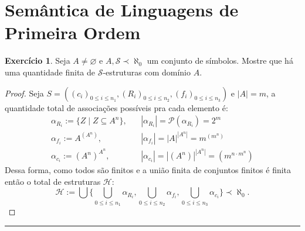 \documentclass[11pt]{article}
\theoremstyle{definition}
\newtheorem{exer}{Exercício}
\newcommand{\mc}[1]{\mathcal{#1}}
\begin{document}
\section{Semântica de Linguagens de Primeira Ordem}

\begin{exer}
Seja $A\ne\varnothing$ e $A,\mc{S}\prec\aleph_0$ um conjunto de símbolos. Mostre que há uma quantidade finita de $\mc{S}$-estruturas com domínio $A$.

\begin{proof}
Seja $S=((c_i)_{0\le i\le n_1},(R_i)_{0\le i\le n_2},(f_i)_{0\le i\le n_3})$ e $|A|=m$, a quantidade total de associações possíveis pra cada elemento é:
\begin{align*}
    \alpha_{R_i} :=\{Z\mid Z\subseteq A^n\}, & ~~~~|\alpha_{R_i}| =\mc{P}(\alpha_{R_i}) = 2^m\\
    \alpha_{f_i} :=A^{\left(A^n\right)}, & ~~~~|\alpha_{f_i}| = |A|^{|A^n|} = m^{\left(m^n\right)}\\
    \alpha_{c_i} :=\left(A^n\right)^{A^n}, & ~~~~|\alpha_{c_i}| = |\left(A^n\right)|^{|A^n|} = \left(m^{n\cdot m^n}\right)
\end{align*}
Dessa forma, como todos são finitos e a união finita de conjuntos finitos é finita então o total de estruturas $\mc{H}$:
\[
\mc{H}:=\bigcup\Biggl\{\bigcup_{0\le i\le n_1}\alpha_{R_i},\bigcup_{0\le i\le n_2}\alpha_{f_i},\bigcup_{0\le i\le n_3}\alpha_{c_i}\Biggr\}\prec\aleph_0.
\]
\end{proof}
\end{exer}

\hrule
\end{document}

